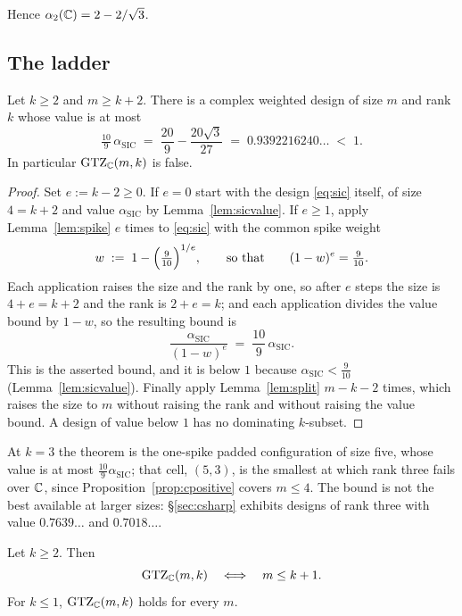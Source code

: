 Hence $\alpha_2(\mathbb{C})=2-2/\sqrt3$.

\subsection{The ladder}\label{sec:cladder}

\begin{theorem}[Lean]\label{thm:ladder}
Let $k\ge2$ and $m\ge k+2$.  There is a complex weighted design of size
$m$ and rank $k$ whose value is at most
\[
  \tfrac{10}9\,\alpha_{\mathrm{SIC}}\;=\;\frac{20}{9}-\frac{20\sqrt3}{27}
  \;=\;0.9392216240\ldots\;<\;1 .
\]
In particular $\mathrm{GTZ}_{\mathbb{C}}(m,k)$ is false.
\end{theorem}

\begin{proof}
Set $e:=k-2\ge0$.  If $e=0$ start with the design \eqref{eq:sic} itself,
of size $4=k+2$ and value $\alpha_{\mathrm{SIC}}$ by Lemma~\ref{lem:sicvalue}.  If
$e\ge1$, apply Lemma~\ref{lem:spike} $e$ times to \eqref{eq:sic} with the
common spike weight
\[
  w\;:=\;1-\Bigl(\tfrac9{10}\Bigr)^{1/e},
  \qquad\text{so that}\qquad (1-w)^{e}=\tfrac9{10}.
\]
Each application raises the size and the rank by one, so after $e$ steps
the size is $4+e=k+2$ and the rank is $2+e=k$; and each application
divides the value bound by $1-w$, so the resulting bound is
\[
  \frac{\alpha_{\mathrm{SIC}}}{(1-w)^{e}}\;=\;\frac{10}{9}\,\alpha_{\mathrm{SIC}} .
\]
This is the asserted bound, and it is below $1$ because
$\alpha_{\mathrm{SIC}}<\tfrac9{10}$ (Lemma~\ref{lem:sicvalue}).  Finally apply
Lemma~\ref{lem:split} $m-k-2$ times, which raises the size to $m$ without
raising the rank and without raising the value bound.  A design of value
below $1$ has no dominating $k$-subset.
\end{proof}

At $k=3$ the theorem is the one-spike padded configuration of size five,
whose value is at most $\tfrac{10}9\alpha_{\mathrm{SIC}}$; that cell, $(5,3)$, is the
smallest at which rank three fails over $\mathbb{C}$, since
Proposition~\ref{prop:cpositive} covers $m\le4$.  The bound is not the
best available at larger sizes: \S\ref{sec:csharp} exhibits designs of
rank three with value $0.7639\ldots$ and $0.7018\ldots$.

\begin{theorem}[Lean]\label{thm:complex}
Let $k\ge2$.  Then
\[
  \mathrm{GTZ}_{\mathbb{C}}(m,k)\quad\Longleftrightarrow\quad m\le k+1 .
\]
For $k\le1$, $\mathrm{GTZ}_{\mathbb{C}}(m,k)$ holds for every $m$.
\end{theorem}

